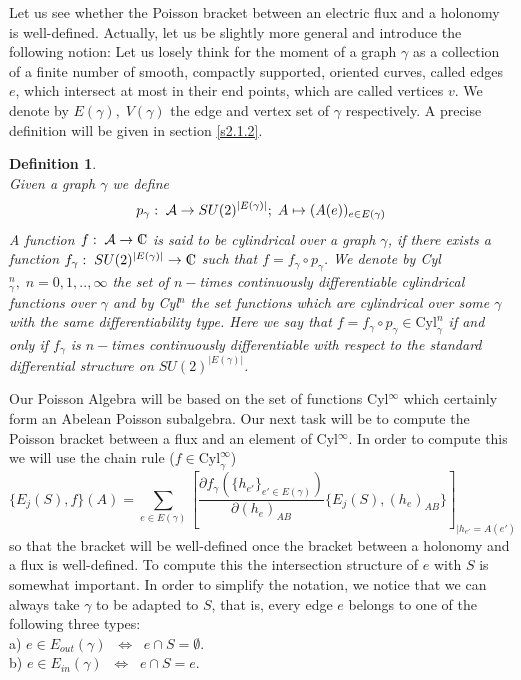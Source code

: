 \documentclass[12pt]{report}
\newtheorem{Definition}{Definition}[section]
\def\be{\begin{equation}}
\def\ee{\end{equation}}
\def\a{{\cal A}}
\def\Cl{{\mathchoice
{\setbox0=\hbox{$\displaystyle\rm C$}\hbox{\hbox to0pt
{\kern0.4\wd0\vrule height0.9\ht0\hss}\box0}}
{\setbox0=\hbox{$\textstyle\rm C$}\hbox{\hbox to0pt
{\kern0.4\wd0\vrule height0.9\ht0\hss}\box0}}
{\setbox0=\hbox{$\scriptstyle\rm C$}\hbox{\hbox to0pt
{\kern0.4\wd0\vrule height0.9\ht0\hss}\box0}}
{\setbox0=\hbox{$\scriptscriptstyle\rm C$}\hbox{\hbox to0pt
{\kern0.4\wd0\vrule height0.9\ht0\hss}\box0}}}}
\begin{document}
Let us see whether the Poisson bracket between an electric flux 
and 
a holonomy is well-defined. Actually, let us be slightly more general and 
introduce the following notion: Let us losely think for the moment of
a graph $\gamma$ as a collection of a finite number of smooth, 
compactly supported, oriented curves, 
called edges $e$, which intersect at most in their end points, which are 
called vertices $v$. We denote by $E(\gamma),\;V(\gamma)$ the edge and 
vertex set of $\gamma$ respectively.
A precise definition will be given in section \ref{s2.1.2}. 
%
\begin{Definition} \label{def2.1.1.1} ~~\\
Given a graph $\gamma$ we define 
\be \label{2.1.1.6}
p_\gamma:\;\a\to SU(2)^{|E(\gamma)|};\;
A\mapsto (A(e))_{e\in E(\gamma)}
\ee
A function $f:\;\a\to \Cl$ is said to be cylindrical over a graph
$\gamma$, if there exists a function $f_\gamma:\;SU(2)^{|E(\gamma)|}\to\Cl$
such that $f=f_\gamma\circ p_\gamma$. We denote by 
Cyl$^n_\gamma,\;n=0,1,..,\infty$ the set of
$n-$times continuously differentiable cylindrical functions over $\gamma$ 
and by 
Cyl$^n$ the set functions which are cylindrical over {\it some} 
$\gamma$ with the same differentiability type. Here we say that 
$f=f_\gamma\circ p_\gamma\in \mbox{Cyl}^n_\gamma$ if and only if
$f_\gamma$ is $n-$times continuously differentiable with respect to the 
standard differential structure on $SU(2)^{|E(\gamma)|}$.
\end{Definition}
%
Our Poisson Algebra will be based on the set of functions Cyl$^\infty$
which certainly form an Abelean Poisson subalgebra. Our next task will
be to compute the Poisson bracket between a flux and an element of
Cyl$^\infty$. In order to compute this we will use the chain rule
($f\in\mbox{Cyl}^\infty_\gamma$)
\be \label{2.1.1.7}
\{E_j(S),f\}(A)=\sum_{e\in E(\gamma)} 
[\frac{\partial f_\gamma(\{h_{e'}\}_{e'\in E(\gamma)})}{\partial (h_e)_{AB}}
\{E_j(S),(h_e)_{AB}\}]_{|h_{e'}=A(e')}
\ee
so that the bracket will be well-defined once the bracket between a holonomy
and a flux is well-defined. To compute this the intersection structure 
of $e$ with $S$ is somewhat important. In order to simplify the notation,
we notice that we can always take $\gamma$ to be adapted to $S$, that is,
every edge $e$ belongs to one of the following three types:\\
a) $e\in E_{out}(\gamma)\;\;\Leftrightarrow\;\;e\cap S=\emptyset$.\\
b) $e\in E_{in}(\gamma)\;\;\Leftrightarrow\;\;e\cap S=e$.\\
\end{document}
